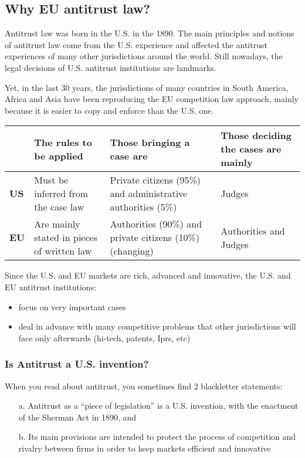     \subsection{Why EU antitrust law?}
    
        Antitrust law was born in the U.S. in the 1890. The main principles and notions of antitrust law come from the U.S. experience and affected the antitrust experiences of many other jurisdictions around the world. Still nowadays, the legal decisions of U.S. antitrust institutions are landmarks.
    
        Yet, in the last 30 years, the jurisdictions of many countries in South America, Africa and Asia have been reproducing the EU competition law approach, mainly because it is easier to copy and enforce than the U.S. one.
    
        
        \begin{table}[h]
            \centering
            \begin{tabular}{|p{1cm}|p{2.5cm}|p{2.5cm}|p{2.5cm}|}
                \hline
                 & \textbf{The rules to be applied} & \textbf{Those bringing a case are} & \textbf{Those deciding the cases are mainly}  \\
                \hline
                \textbf{US} & Must be inferred from the case law & Private citizens (95\%) and administrative authorities (5\%) & Judges \\
                \hline
                \textbf{EU} & Are mainly stated in pieces of written law & Authorities (90\%) and private citizens (10\%) (changing) & Authorities and Judges \\
                \hline
            \end{tabular}
            \label{tab:my_label}
        \end{table}

        Since the U.S. and EU markets are rich, advanced and innovative, the U.S. and EU antitrust institutions:
            \begin{itemize}
                \item focus on very important cases
                \item deal in advance with many competitive problems that other jurisdictions will face only afterwards (hi-tech, patents, Iprs, etc)
            \end{itemize}
    
            \subsubsection{Is Antitrust a U.S. invention?}
                When you read about antitrust, you sometimes find 2 blackletter statements: 
                \begin{itemize}
                    \item[a.] Antitrust as a “piece of legislation” is a U.S. invention, with the enactment of the Sherman Act in 1890, and 
                    \item[b.] Its main provisions are intended to protect the process of competition and rivalry between firms in order to keep markets efficient and innovative
                \end{itemize}
    
